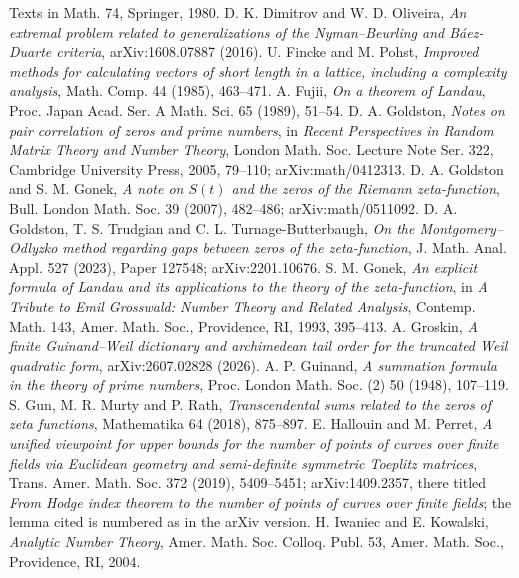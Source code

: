   Texts in Math. 74, Springer, 1980.
 D. K. Dimitrov and W. D. Oliveira, \emph{An extremal problem related to generalizations of
  the Nyman--Beurling and B\'aez-Duarte criteria}, arXiv:1608.07887 (2016).
 U. Fincke and M. Pohst, \emph{Improved methods for calculating vectors of short length in a
  lattice, including a complexity analysis}, Math. Comp. 44 (1985), 463--471.
 A. Fujii, \emph{On a theorem of Landau}, Proc. Japan Acad. Ser. A Math. Sci. 65 (1989), 51--54.
 D. A. Goldston, \emph{Notes on pair correlation of zeros and prime numbers}, in \emph{Recent
  Perspectives in Random Matrix Theory and Number Theory}, London Math. Soc. Lecture Note Ser. 322, Cambridge
  University Press, 2005, 79--110; arXiv:math/0412313.
 D. A. Goldston and S. M. Gonek, \emph{A note on $S(t)$ and the zeros of the Riemann
  zeta-function}, Bull. London Math. Soc. 39 (2007), 482--486; arXiv:math/0511092.
 D. A. Goldston, T. S. Trudgian and C. L. Turnage-Butterbaugh, \emph{On the Montgomery--Odlyzko method
  regarding gaps between zeros of the zeta-function}, J. Math. Anal. Appl. 527 (2023), Paper 127548; arXiv:2201.10676.
 S. M. Gonek, \emph{An explicit formula of Landau and its applications to the theory of the
  zeta-function}, in \emph{A Tribute to Emil Grosswald: Number Theory and Related Analysis}, Contemp. Math. 143, Amer.
  Math. Soc., Providence, RI, 1993, 395--413.
 A. Groskin, \emph{A finite Guinand--Weil dictionary and archimedean tail order for the truncated
Weil   quadratic form}, arXiv:2607.02828 (2026).
 A. P. Guinand, \emph{A summation formula in the theory of prime numbers}, Proc. London Math. Soc.
  (2) 50 (1948), 107--119.
 S. Gun, M. R. Murty and P. Rath, \emph{Transcendental sums related to the zeros of zeta
  functions}, Mathematika 64 (2018), 875--897.
 E. Hallouin and M. Perret, \emph{A unified viewpoint for upper bounds for the number of points
  of curves over finite fields via Euclidean geometry and semi-definite symmetric Toeplitz matrices}, Trans. Amer. Math.
  Soc. 372 (2019), 5409--5451; arXiv:1409.2357, there titled \emph{From Hodge index theorem to the number of points of
  curves over finite fields}; the lemma cited is numbered as in the arXiv version.
 H. Iwaniec and E. Kowalski, \emph{Analytic Number Theory}, Amer. Math. Soc. Colloq. Publ. 53,
  Amer. Math. Soc., Providence, RI, 2004.
